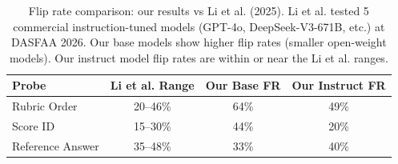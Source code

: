 \begin{table}[h]
\centering\small
\caption{Flip rate comparison: our results vs Li et al. (2025).
Li et al. tested 5 commercial instruction-tuned models (GPT-4o, DeepSeek-V3-671B, etc.)
at DASFAA 2026. Our base models show higher flip rates (smaller open-weight models).
Our instruct model flip rates are within or near the Li et al. ranges.}
\label{tab:comparison}
\begin{tabular}{lccc}
\toprule
\textbf{Probe} & \textbf{Li et al. Range} & \textbf{Our Base FR} & \textbf{Our Instruct FR} \\
\midrule
Rubric Order & 20--46\% & 64\% & 49\% \\
Score ID & 15--30\% & 44\% & 20\% \\
Reference Answer & 35--48\% & 33\% & 40\% \\
\bottomrule
\end{tabular}
\end{table}
